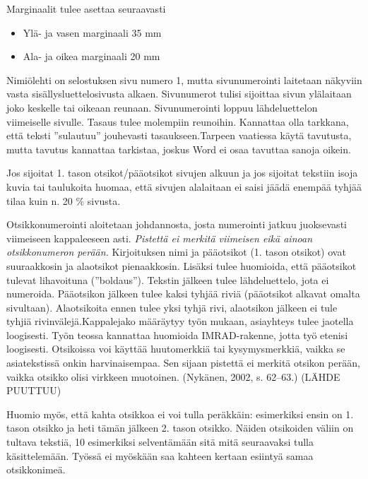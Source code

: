\documentclass{LUT_pohja}[2016/03/09 LUT Dippa Pohja]
\begin{document}
\newpage
Marginaalit tulee asettaa seuraavasti 
\begin{itemize}
\item Ylä- ja vasen marginaali 35 mm
\item Ala- ja oikea marginaali 20 mm
\end{itemize}
Nimiölehti on selostuksen sivu numero 1, mutta sivunumerointi laitetaan näkyviin vasta 
sisällysluettelosivusta alkaen. Sivunumerot tulisi sijoittaa sivun ylälaitaan joko keskelle tai oikeaan reunaan. Sivunumerointi loppuu lähdeluettelon viimeiselle sivulle. Tasaus tulee molempiin reunoihin. Kannattaa olla tarkkana, että teksti ”sulautuu” jouhevasti tasaukseen.Tarpeen vaatiessa käytä tavutusta, mutta tavutus kannattaa tarkistaa, joskus Word ei osaa tavuttaa sanoja oikein.\par

Jos sijoitat 1. tason otsikot/pääotsikot sivujen alkuun ja jos sijoitat tekstiin isoja kuvia tai taulukoita huomaa, että sivujen alalaitaan ei saisi jäädä enempää tyhjää tilaa kuin n. 20 \% sivusta.\citep[s. 16.]{Kauppinen01a} 

Otsikkonumerointi aloitetaan johdannosta, josta numerointi jatkuu juoksevasti viimeiseen kappaleeseen  asti. \textit{Pistettä ei merkitä viimeisen eikä ainoan otsikkonumeron perään.} Kirjoituksen nimi ja pääotsikot (1. tason otsikot) ovat suuraakkosin ja alaotsikot pienaakkosin. \citep[s. 34.]{Varis97} Lisäksi tulee huomioida, että pääotsikot tulevat lihavoituna (”boldaus”). Tekstin jälkeen tulee lähdeluettelo, jota ei numeroida. Pääotsikon jälkeen tulee kaksi tyhjää riviä (pääotsikot alkavat omalta sivultaan). Alaotsikoita ennen tulee yksi tyhjä rivi, alaotsikon jälkeen ei tule tyhjiä rivinvälejä.Kappalejako määräytyy työn mukaan, asiayhteys tulee jaotella loogisesti. Työn teossa kannattaa huomioida IMRAD-rakenne, jotta työ etenisi loogisesti. Otsikoissa voi käyttää huutomerkkiä tai kysymysmerkkiä, vaikka se asiatekstissä onkin harvinaisempaa. Sen sijaan pistettä ei merkitä otsikon perään, vaikka otsikko olisi virkkeen muotoinen. (Nykänen, 2002, s. 62–63.) (LÄHDE PUUTTUU)\par

Huomio myös, että kahta otsikkoa ei voi tulla peräkkäin: esimerkiksi ensin on 1. tason 
otsikko ja heti tämän jälkeen 2. tason otsikko. Näiden otsikoiden väliin on tultava tekstiä, 10 esimerkiksi selventämään sitä mitä seuraavaksi tulla käsittelemään. Työssä ei myöskään saa kahteen kertaan esiintyä samaa otsikkonimeä.\par
\end{document}
